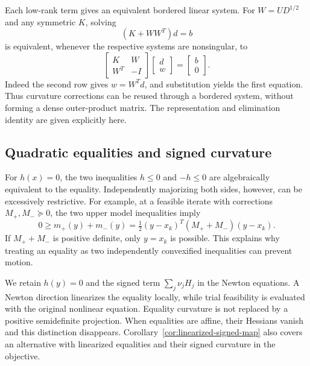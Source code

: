 \documentclass[pdflatex,sn-mathphys-num]{sn-jnl}
\theoremstyle{thmstyleone}
\theoremstyle{thmstylethree}
\begin{document}
Each low-rank term gives an equivalent bordered linear system.
For $W=UD^{1/2}$ and any symmetric $K$, solving
\[
 (K+WW^T)d=b
\]
is equivalent, whenever the respective systems are nonsingular, to
\begin{equation}\label{eq:border}
 \begin{bmatrix}K&W\\W^T&-I\end{bmatrix}
 \begin{bmatrix}d\\w\end{bmatrix}
 =\begin{bmatrix}b\\0\end{bmatrix}.
\end{equation}
Indeed the second row gives $w=W^Td$, and substitution yields the first
equation. Thus curvature corrections can be reused through a bordered system,
without forming a dense outer-product matrix. The representation and
elimination identity are given explicitly here.

\subsection{Quadratic equalities and signed curvature}\label{sec:equalities}
For $h(x)=0$, the two inequalities $h\leq0$ and $-h\leq0$ are
algebraically equivalent to the equality. Independently majorizing both
sides, however, can be excessively restrictive. For example, at a
feasible iterate with corrections $M_+,M_-\succeq0$, the two upper model
inequalities imply
\[
 0\geq m_+(y)+m_-(y)
   =\tfrac12(y-x_k)^T(M_++M_-)(y-x_k).
\]
If $M_++M_-$ is positive definite, only $y=x_k$ is possible.
This explains why treating an equality as two independently convexified
inequalities can prevent motion.

We retain $h(y)=0$ and the signed term
$\sum_j\nu_jH_j$ in the Newton equations. A Newton direction linearizes the equality locally,
while trial feasibility is evaluated with the original nonlinear equation. Equality curvature is not replaced by a positive semidefinite
projection. When equalities are affine, their Hessians vanish and this
distinction disappears.
Corollary~\ref{cor:linearized-signed-map} also covers an alternative
with linearized equalities and their signed curvature in the objective.
\end{document}
